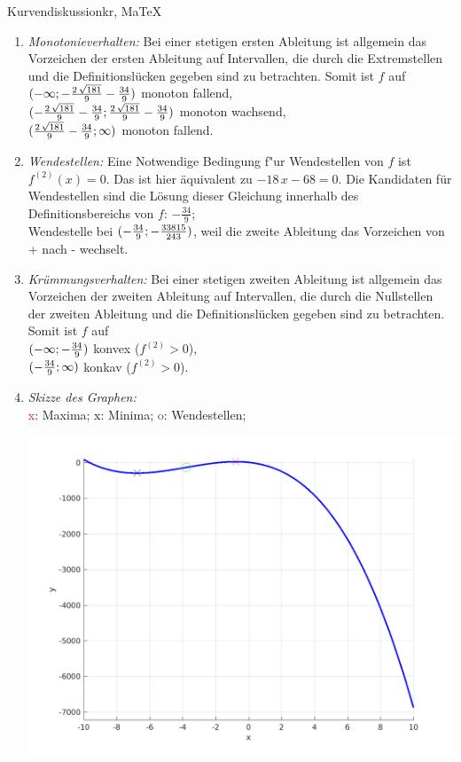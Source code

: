 \begin{MAufgabe}{Kurvendiskussion}{kr, MaTeX}
\begin{enumerate}
 \item \emph{Monotonieverhalten:} 
 Bei einer stetigen ersten Ableitung ist allgemein das Vorzeichen der ersten Ableitung auf Intervallen, die durch die Extremstellen und die Definitionsl\"ucken gegeben sind zu betrachten. Somit ist $f$ auf \\ 
 $(-\infty; - \frac{2\, \sqrt{181}}{9} - \frac{34}{9})$ monoton fallend, \\ 
 $( - \frac{2\, \sqrt{181}}{9} - \frac{34}{9};\frac{2\, \sqrt{181}}{9} - \frac{34}{9})$ monoton  wachsend, \\ 
 $(\frac{2\, \sqrt{181}}{9} - \frac{34}{9}; \infty)$ monoton fallend. \\ 
 \item \emph{Wendestellen:} 
 Eine Notwendige Bedingung f"ur Wendestellen von $f$ ist $f^{(2)}(x)=0$. 
 Das ist hier \"aquivalent zu $ - 18\, x - 68=0$. 
 Die Kandidaten f\"ur Wendestellen sind die L\"osung dieser Gleichung innerhalb des Definitionsbereichs von $f$: $- \frac{34}{9}$; \\ 
 Wendestelle bei $(- \frac{34}{9};- \frac{33815}{243})$, weil die zweite Ableitung das Vorzeichen von + nach - wechselt. \\ 
 \item \emph{Kr\"ummungsverhalten:} 
 Bei einer stetigen zweiten Ableitung ist allgemein das Vorzeichen der zweiten Ableitung auf Intervallen, die durch die Nullstellen der zweiten Ableitung und die Definitionsl\"ucken gegeben sind zu betrachten. 
 Somit ist $f$ auf \\ 
 $(-\infty ;- \frac{34}{9})$  konvex ($f^{(2)}>0$), \\ 
 $(- \frac{34}{9}; \infty)$  konkav ($f^{(2)}>0$). \\ 
 \item \emph{Skizze des Graphen:} \\ 
 {\textcolor{red} x}: Maxima; {\textcolor{black} x}: Minima; {\textcolor{green} o}: Wendestellen; 
  \begin{center}
  \includegraphics[width=0.8\linewidth]{Abb_zur_Ag_autogenerated_fractions_48.png} \end{center}
  
 \end{enumerate}
 \else\relax\fi
  \end{MAufgabe}